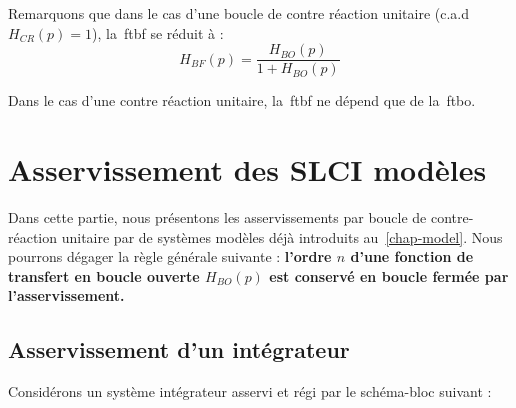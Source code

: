Remarquons que dans le cas d'une boucle de contre réaction unitaire 
(c.a.d $H_{CR}(p)=1$), la~\gls{ftbf} se réduit à :
$$
H_{BF}(p)=\dfrac{H_{BO}(p)}{1+H_{BO}(p)}
$$

Dans le cas d'une contre réaction unitaire, la~\gls{ftbf} ne dépend 
que de la~\gls{ftbo}.


\section{Asservissement des SLCI modèles}

Dans cette partie, nous présentons les asservissements par boucle 
de contre-réaction unitaire par de systèmes modèles déjà introduits 
au~\cref{chap-model}. Nous pourrons dégager la règle générale suivante :
\textbf{l'ordre $n$ d'une fonction de transfert en boucle ouverte $H_{BO}(p)$
est conservé en boucle fermée par l'asservissement.}

\subsection{Asservissement d'un intégrateur}

Considérons un système intégrateur asservi et régi par le schéma-bloc suivant :
\begin{center}
\end{center}

